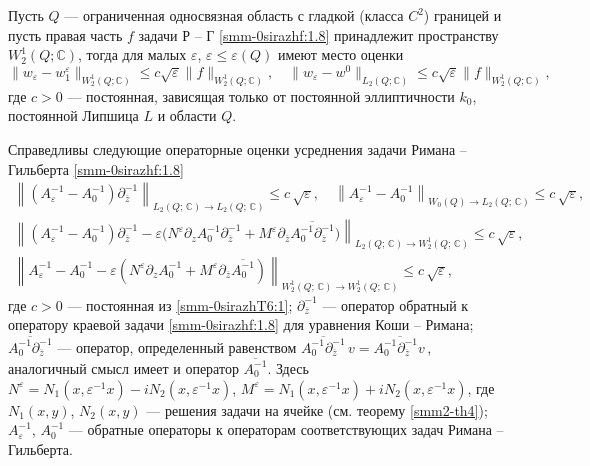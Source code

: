 \begin{theorem}
{ Пусть $Q$ --- ограниченная односвязная область с гладкой (класса $C^2$) границей и пусть правая часть $f$ задачи Р -- Г \eqref{smm-0sirazhf:1.8} принадлежит пространству $W_2^1(Q;\mathbb{C})$, тогда для малых $\varepsilon$, $\varepsilon\leqslant \varepsilon(Q)$ имеют место оценки
	\begin{equation}\label{smm-0sirazhT6:1}
		\|w_\varepsilon-w_1^\varepsilon\|_{W_2^1 (Q; \mathbb{C})}\leqslant c\sqrt{\varepsilon}\|f
		\|_{W^1_2 (Q; \mathbb{C})}, \quad \|w_\varepsilon-w^0\|_{L_2 (Q; \mathbb{C})}\leqslant c\sqrt{\varepsilon}\|f
		\|_{W_2^1 (Q; \mathbb{C})},
	\end{equation}
	где $c>0$ --- постоянная, зависящая только от постоянной эллиптичности $k_0$,  постоянной Липшица $L$ и области $Q$.}
\end{theorem}




\begin{theorem}
{ Справедливы следующие операторные оценки усреднения задачи Римана -- Гильберта \eqref{smm-0sirazhf:1.8}
	\begin{gather}\label{smm-0sirazhOpop1}
		\left\|\left(A_\varepsilon^{-1}-A_0^{-1}\right)\partial_{\overline z}^{-1}\right\|_{L_2(Q;\,\mathbb{C})\to L_2(Q;\,\mathbb{C})}
		\leq c\,\sqrt\varepsilon,\quad
		\left\|A_\varepsilon^{-1}-A_0^{-1}\right\|_{W_0(Q)\to L_2(Q;\,\mathbb{C})}
		\leq c\,\sqrt\varepsilon,\\\label{smm-0sirazhOpop2}
		\left\|\left(A_\varepsilon^{-1}-A_0^{-1}\right)\partial_{\overline z}^{-1}-\varepsilon\Big(N^\varepsilon
		\partial_zA_0^{-1}
		\partial_{\overline z}^{-1}\right.
		+\left.M^\varepsilon\partial_{\overline z}\overline{A_0^{-1}\partial_{\overline z}^{-1}}\Big)
		\right\|_{L_2(Q;\,\mathbb{C})\to W^1_2(Q;\,\mathbb{C})}
		\leq c\,\sqrt\varepsilon,\\\label{smm-0sirazhOpop3}
		\left\|A_\varepsilon^{-1}-A_0^{-1}-\varepsilon\left(N^\varepsilon\partial_zA_0^{-1}
		+M^\varepsilon\partial_{\overline z}\overline{A_0^{-1}}\right)
		\right\|_{W^1_2(Q;\,\mathbb{C})\to W^1_2(Q;\,\mathbb{C})}
		\leq c\,\sqrt\varepsilon,
	\end{gather}
	где $c>0$ --- постоянная из \eqref{smm-0sirazhT6:1}; $\partial_{\overline z}^{-1}$ --- оператор обратный к
	оператору краевой задачи
	\eqref{smm-0sirazhf:1.8} для уравнения Коши -- Римана;
	$\overline{A_0^{-1}\partial_{\overline z}^{-1}}$ --- оператор,
	определенный равенством $\overline{A_0^{-1}\partial_{\overline z}^{-1}}{\,v}=\overline{A_0^{-1}\partial_{\overline z}^{-1}{v\,}}$,
	аналогичный смысл имеет и оператор $\overline{A_0^{-1}}$. Здесь
	$N^\varepsilon=N_1(x,\varepsilon^{-1}x)-iN_2(x,\varepsilon^{-1}x)$, $M^\varepsilon=N_1(x,\varepsilon^{-1}x)+iN_2(x,\varepsilon^{-1}x)$,  где $N_1(x,y)$, $N_2(x,y)$ --- решения задачи
	на ячейке (см. теорему \ref{smm2-th4}); $A_\varepsilon^{-1}$, $A_0^{-1}$
	--- обратные операторы к операторам соответствующих  задач Римана -- Гильберта}.
\end{theorem}

